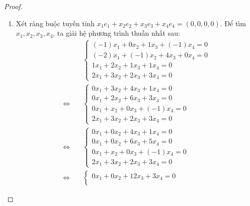 \begin{proof}
    \begin{enumerate}[label = (\alph*)]
        \item Xét ràng buộc tuyến tính $x_{1}e_{1} + x_{2}e_{2} + x_{3}e_{3} + x_{4}e_{4} = (0,0,0,0)$. Để tìm $x_{1}, x_{2}, x_{3}, x_{4}$, ta giải hệ phương trình thuần nhất sau:
              \begingroup
              \allowdisplaybreaks
              \begin{align*}
                                       & \begin{cases}
                                             (-1)x_{1} + 0x_{2} + 1x_{3} + (-1)x_{4} = 0 \\
                                             (-2)x_{1} + (-1)x_{2} + 4x_{3} + 0x_{4} = 0 \\
                                             1x_{1} + 2x_{2} + 1x_{3} + 1x_{4} = 0       \\
                                             2x_{1} + 3x_{2} + 2x_{3} + 3x_{4} = 0
                                         \end{cases} \\
                  \Longleftrightarrow\quad &
                  \begin{cases}
                      0x_{1} + 3x_{2} + 4x_{3} + 1x_{4} = 0   \\
                      0x_{1} + 2x_{2} + 6x_{3} + 3x_{4} = 0   \\
                      0x_{1} + x_{2} + 0x_{3} + (-1)x_{4} = 0 \\
                      2x_{1} + 3x_{2} + 2x_{3} + 3x_{4} = 0
                  \end{cases}                            \\
                  \Longleftrightarrow\quad &
                  \begin{cases}
                      0x_{1} + 0x_{2} + 4x_{3} + 1x_{4} = 0   \\
                      0x_{1} + 0x_{2} + 6x_{3} + 5x_{4} = 0   \\
                      0x_{1} + x_{2} + 0x_{3} + (-1)x_{4} = 0 \\
                      2x_{1} + 3x_{2} + 2x_{3} + 3x_{4} = 0
                  \end{cases}                            \\
                  \Longleftrightarrow\quad &
                  \begin{cases}
                      0x_{1} + 0x_{2} + 12x_{3} + 3x_{4} = 0  \\

\end{cases}
\end{align*}
\end{enumerate}
\end{proof}
